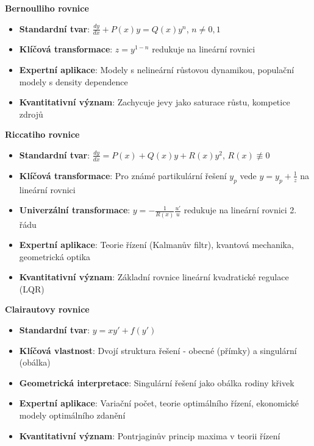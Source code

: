 \noindent\textbf{Bernoulliho rovnice}
\begin{itemize}
\item \textbf{Standardní tvar}: $\frac{dy}{dx} + P(x)y = Q(x)y^n$, $n \neq 0, 1$
\item \textbf{Klíčová transformace}: $z = y^{1-n}$ redukuje na lineární rovnici
\item \textbf{Expertní aplikace}: Modely s nelineární růstovou dynamikou, populační modely s density dependence
\item \textbf{Kvantitativní význam}: Zachycuje jevy jako saturace růstu, kompetice zdrojů
\end{itemize}

\vspace{1\baselineskip}

\noindent\textbf{Riccatiho rovnice}
\begin{itemize}
\item \textbf{Standardní tvar}: $\frac{dy}{dx} = P(x) + Q(x)y + R(x)y^2$, $R(x) \not\equiv 0$
\item \textbf{Klíčová transformace}: Pro známé partikulární řešení $y_p$ vede $y = y_p + \frac{1}{z}$ na lineární rovnici
\item \textbf{Univerzální transformace}: $y = -\frac{1}{R(x)}\frac{u'}{u}$ redukuje na lineární rovnici 2. řádu
\item \textbf{Expertní aplikace}: Teorie řízení (Kalmanův filtr), kvantová mechanika, geometrická optika
\item \textbf{Kvantitativní význam}: Základní rovnice lineární kvadratické regulace (LQR)
\end{itemize}

\vspace{1\baselineskip}

\noindent\textbf{Clairautovy rovnice}
\begin{itemize}
\item \textbf{Standardní tvar}: $y = xy' + f(y')$
\item \textbf{Klíčová vlastnost}: Dvojí struktura řešení - obecné (přímky) a singulární (obálka)
\item \textbf{Geometrická interpretace}: Singulární řešení jako obálka rodiny křivek
\item \textbf{Expertní aplikace}: Variační počet, teorie optimálního řízení, ekonomické modely optimálního zdanění
\item \textbf{Kvantitativní význam}: Pontrjaginův princip maxima v teorii řízení
\end{itemize}

